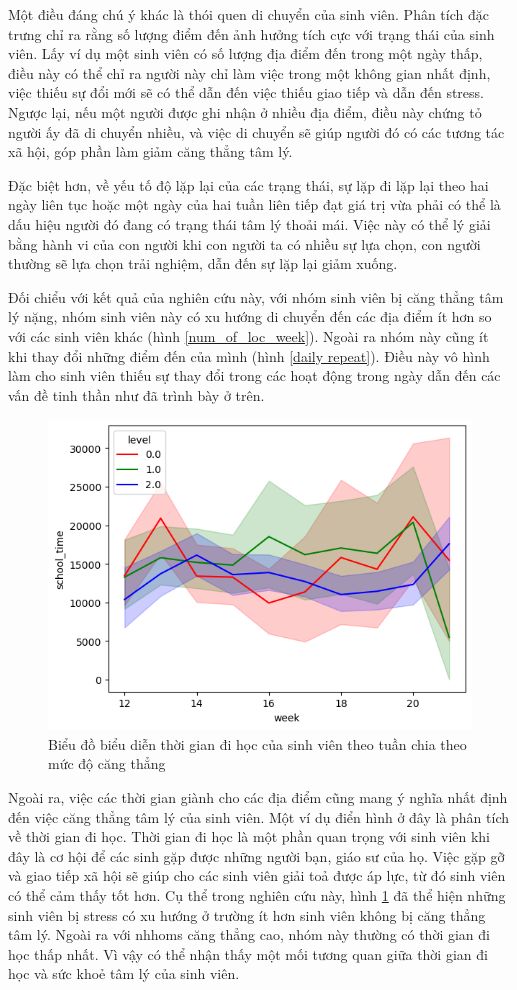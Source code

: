 Một điều đáng chú ý khác là thói quen di chuyển của sinh viên. Phân tích đặc trưng chỉ ra rằng số lượng điểm đến ảnh hưởng tích cực với trạng thái của sinh viên. Lấy ví dụ một sinh viên có số lượng địa điểm đến trong một ngày thấp, điều này có thể chỉ ra người này chỉ làm việc trong một không gian nhất định, việc thiếu sự đổi mới sẽ có thể dẫn đến việc thiếu giao tiếp và dẫn đến stress. Ngược lại, nếu một người được ghi nhận ở nhiều địa điểm, điều này chứng tỏ người ấy đã di chuyển nhiều, và việc di chuyển sẽ giúp người đó có các tương tác xã hội, góp phần làm giảm căng thẳng tâm lý. 

Đặc biệt hơn, về yếu tố độ lặp lại của các trạng thái, sự lặp đi lặp lại theo hai ngày liên tục hoặc một ngày của hai tuần liên tiếp đạt giá trị vừa phải có thể là dấu hiệu người đó đang có trạng thái tâm lý thoải mái. Việc này có thể lý giải bằng hành vi của con người khi con người ta có nhiều sự lựa chọn, con người thường sẽ lựa chọn trải nghiệm, dẫn đến sự lặp lại giảm xuống. 

Đối chiểu với kết quả của nghiên cứu này, với nhóm sinh viên bị căng thẳng tâm lý nặng, nhóm sinh viên này có xu hướng di chuyển đến các địa điểm ít hơn so với các sinh viên khác (hình \ref{num_of_loc_week}). Ngoài ra nhóm này cũng ít khi thay đổi những điểm đến của mình (hình \ref{daily repeat}). Điều này vô hình làm cho sinh viên thiếu sự thay đổi trong các hoạt động trong ngày dẫn đến các vấn đề tinh thần như đã trình bày ở trên.


\begin{figure}[!ht]
    \centering
    \includegraphics[width=0.75\linewidth]{Shooltime_week_line.png}
    \caption{Biểu đồ biểu diễn thời gian đi học của sinh viên theo tuần chia theo mức độ căng thẳng}
    \label{line_week_school}
\end{figure}
Ngoài ra, việc các thời gian giành cho các địa điểm cũng mang ý nghĩa nhất định đến việc căng thẳng tâm lý của sinh viên. Một ví dụ điển hình ở đây là phân tích về thời gian đi học. Thời gian đi học là một phần quan trọng với sinh viên khi đây là cơ hội để các sinh gặp được những người bạn, giáo sư của họ. Việc gặp gỡ và giao tiếp xã hội sẽ giúp cho các sinh viên giải toả được áp lực, từ đó sinh viên có thể cảm thấy tốt hơn. Cụ thể trong nghiên cứu này, hình \ref{line_week_school} đã thể hiện những sinh viên bị stress có xu hướng ở trường ít hơn sinh viên không bị căng thẳng tâm lý. Ngoài ra với nhhoms căng thẳng cao, nhóm này thường có thời gian đi học thấp nhất. Vì vậy có thể nhận thấy một mối tương quan giữa thời gian đi học và sức khoẻ tâm lý của sinh viên.

